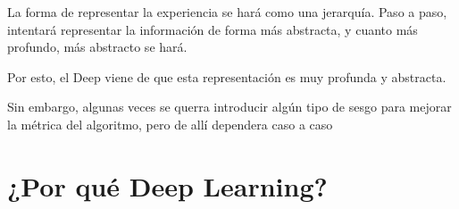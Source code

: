 La forma de representar la experiencia se hará como una jerarquía. Paso a paso, intentará representar la información de forma más abstracta, y cuanto más profundo, más abstracto se hará.

Por esto, el Deep viene de que esta representación es muy profunda y abstracta.

Sin embargo, algunas veces se querra introducir algún tipo de sesgo para mejorar la métrica del algoritmo, pero de allí dependera caso a caso

\section{¿Por qué Deep Learning?}

